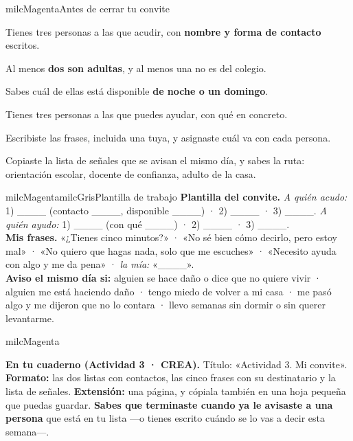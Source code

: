 \documentclass[11pt,letterpaper]{article}
\begin{document}
\begin{drawbox}{milcMagenta}{Antes de cerrar tu convite}
\begin{checklista}
\item Tienes tres personas a las que acudir, con \textbf{nombre y forma de contacto} escritos.
\item Al menos \textbf{dos son adultas}, y al menos una no es del colegio.
\item Sabes cuál de ellas está disponible \textbf{de noche o un domingo}.
\item Tienes tres personas a las que puedes ayudar, con qué en concreto.
\item Escribiste las frases, incluida una tuya, y asignaste cuál va con cada persona.
\item Copiaste la lista de señales que se avisan el mismo día, y sabes la ruta: orientación escolar, docente de confianza, adulto de la casa.
\end{checklista}
\end{drawbox}

\begin{softbox}{milcMagenta}{milcGris}{Plantilla de trabajo}
\textbf{Plantilla del convite.} \emph{A quién acudo:} 1) \_\_\_\_ (contacto \_\_\_\_, disponible \_\_\_\_) · 2) \_\_\_\_ · 3) \_\_\_\_. \emph{A quién ayudo:} 1) \_\_\_\_ (con qué \_\_\_\_) · 2) \_\_\_\_ · 3) \_\_\_\_. \\[1mm]
\textbf{Mis frases.} «¿Tienes cinco minutos?» · «No sé bien cómo decirlo, pero estoy mal» · «No quiero que hagas nada, solo que me escuches» · «Necesito ayuda con algo y me da pena» · \emph{la mía:} «\_\_\_\_». \\[1mm]
\textbf{Aviso el mismo día si:} alguien se hace daño o dice que no quiere vivir · alguien me está haciendo daño · tengo miedo de volver a mi casa · me pasó algo y me dijeron que no lo contara · llevo semanas sin dormir o sin querer levantarme.
\end{softbox}

\begin{infoband}{milcMagenta}


\textbf{En tu cuaderno (Actividad 3 · CREA).} Título: «Actividad 3. Mi convite». \textbf{Formato:} las dos listas con contactos, las cinco frases con su destinatario y la lista de señales. \textbf{Extensión:} una página, y cópiala también en una hoja pequeña que puedas guardar. \textbf{Sabes que terminaste cuando} \textbf{ya le avisaste a una persona} que está en tu lista ---o tienes escrito cuándo se lo vas a decir esta semana---.
\end{infoband}
\end{document}
